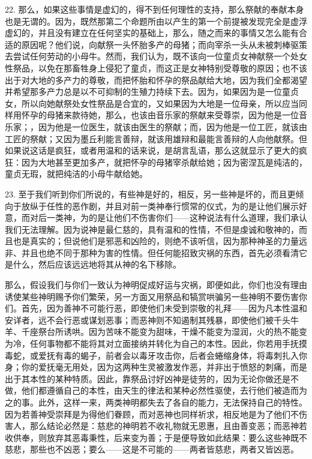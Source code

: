 22. 那么，如果这些事情是虚幻的，得不到任何理性的支持，那么祭献的奉献本身也是无谓的。因为，既然那第二个命题所由以产生的第一个前提被发现完全是虚浮虚幻的，并且没有建立在任何坚实的基础上，那么，随之而来的事情又怎么能有合适的原因呢？他们说，向献祭一头怀胎多产的母猪；而向宰杀一头从未被刺棒驱策去尝试任何劳动的小母牛。然而，我们认为，既不该向一位童贞女神献祭一个处女性祭品，以免在那畜牲身上侵犯了童贞，而这正是女神特别受尊敬的原因；也不该出于对大地的多产力的尊敬，而把怀胎和怀孕的祭品献给大地，因为我们全都渴望并希望那多产力总是以不可抑制的生殖力持续下去。因为，如果因为是一位童贞女，所以向她献祭处女性祭品是合宜的，又如果因为大地是一位母亲，所以应当同样用怀孕的母猪来款待她，那么，也该由音乐家的祭献来受尊崇，因为他是一位音乐家；，因为他是一位医生，就该由医生的祭献；而，因为他是一位工匠，就该由工匠的祭献；又因为墨丘利能言善辩，就该用雄辩和最能言善辩的人向他献祭。但如果说这话是疯狂，或者用温和的话来说，是胡言乱语，那么这就显示了更大的疯狂：因为大地甚至更加多产，就把怀孕的母猪宰杀献给她；因为密涅瓦是纯洁的，童贞无瑕，就把纯洁的小母牛献给她。\par

23. 至于我们听到你们所说的，有些神是好的，相反，另一些神是坏的，而且更倾向于放纵于任性的恶作剧，并且对前一类神奉行惯常的仪式，为的是让他们展示好意，而对后一类神，为的是让他们不伤害你们——这种说法有什么道理，我们承认我们无法理解。因为说神是最仁慈的，具有温和的性情，不但是虔诚和敬神的，而且也是真实的；但说他们是邪恶和凶险的，则绝不该听信，因为那种神圣的力量远非、并且也绝不同于那种为害的性情。但任何能招致灾祸的东西，首先必须看清它是什么，然后应该远远地将其从神的名下移除。\par

那么，假设我们与你们一致认为神明促成好运与灾祸，即便如此，你们也没有理由诱使某些神明赐予你们繁荣，另一方面又用祭品和犒赏哄骗另一些神明不要伤害你们。首先，因为善神不可能行恶，即使他们未受到崇敬的礼拜——因为凡本性温和安详者，远不会行恶或谋划恶事；而恶神则不知遏制其残暴，即使他们被千头牛羊、千座祭台所诱哄。因为苦味不能变为甜味，干燥不能变为湿润，火的热不能变为冷，任何事物都不能将其对立面接纳并转化为自己的本性。因此，你若用手抚摸毒蛇，或爱抚有毒的蝎子，前者会以毒牙攻击你，后者会蜷缩身体，将毒刺扎入你身；你的爱抚毫无用处，因为这两种生灵被激发作恶，并非出于愤怒的刺痛，而是出于其本性的某种特质。因此，靠祭品讨好凶神是徒劳的，因为无论你做还是不做，他们都遵循自己的本性，由天生的律法和某种必然性驱使，去行他们被造而为之的事。此外，这样一来，两类神明都失去了各自的能力，无法保持自己的特性。因为若善神受崇拜是为得他们眷顾，而对恶神也同样祈求，相反地是为了他们不伤害人，那么结论必然是：慈悲的神明若不收礼物就无恩惠，且由善变恶；而恶神若收供奉，则放弃其恶毒秉性，后来变为善；于是便导致如此结果：要么这些神既不慈悲，那些也不凶恶；要么——这是不可能的——两者皆慈悲，两者又皆凶恶。\par

